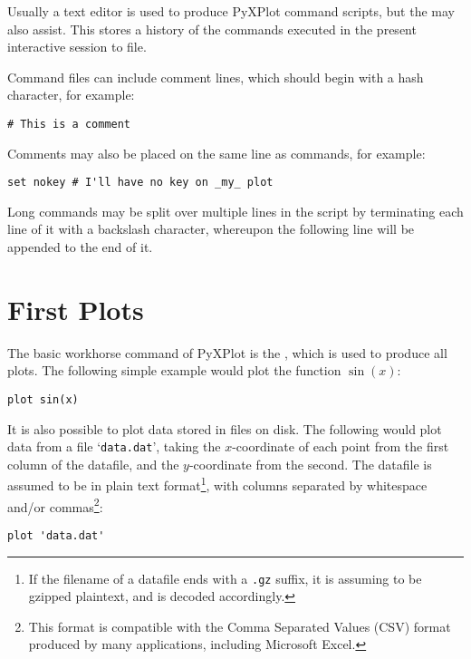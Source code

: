 Usually a text editor is used to produce PyXPlot command scripts, but the
 may also assist. This stores a history of the commands executed
in the present interactive session to file.

Command files can include comment lines, which should begin with a hash
character, for example:

\begin{verbatim}
# This is a comment
\end{verbatim}

\noindent Comments may also be placed on the same line as commands, for
example:

\begin{verbatim}
set nokey # I'll have no key on _my_ plot
\end{verbatim}

Long commands may be split over multiple lines in the script by terminating
each line of it with a backslash character, whereupon the following line will
be appended to the end of it.

\section{First Plots}
\label{first_plots}

The basic workhorse command of PyXPlot is the , which is used
to produce all plots. The following simple example would plot the function
$\sin(x)$:

\begin{verbatim}
plot sin(x)
\end{verbatim}

\noindent It is also possible to plot data stored in files on disk. The
following would plot data from a file `{\tt data.dat}', taking the
$x$-coordinate of each point from the first column of the datafile, and the
$y$-coordinate from the second.  The datafile is assumed to be in plain text
format\footnote{If the filename of a datafile ends with a {\tt .gz} suffix,
it is assuming to be gzipped plaintext, and is decoded accordingly.}, with
columns separated by whitespace and/or commas\footnote{This format is
compatible with the Comma Separated Values (CSV) format produced by many
applications, including Microsoft Excel.}:

\begin{verbatim}
plot 'data.dat'
\end{verbatim}

